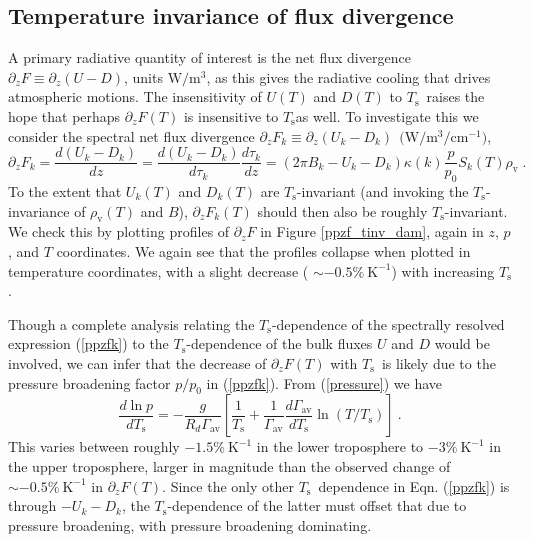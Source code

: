 \documentclass[10pt]{article}
\newcommand{\beqn}{\begin{equation}}
\newcommand{\eeqn}{\end{equation}}
\newcommand{\eqnref}[1]{(\ref{#1})}
\newcommand{\n}{\nonumber}
\newcommand{\der}[2]{\ensuremath{\frac{d #1}{d #2}}}
\newcommand{\ppz}{\ensuremath{\partial_z}}
\newcommand{\cminverse}{\ensuremath{\mathrm{cm^{-1}}}}
\newcommand{\tauk}{\ensuremath{\tau_k}}
\newcommand{\rhov}{\ensuremath{\rho_\mathrm{v}}}
\newcommand{\Ts}{\ensuremath{T_\mathrm{s}}}
\newcommand{\gammaav}{\ensuremath{\Gamma_\mathrm{av}}}
\newcommand{\Kinverse}{\ensuremath{\mathrm{K^{-1}}}}
\begin{document}
	\subsection{Temperature invariance of flux divergence}
		A primary radiative quantity of interest is the net flux divergence $\ppz F \equiv \ppz (U-D)$, units  $\mathrm{W/m^3}$, as this gives the radiative cooling that drives atmospheric motions. The insensitivity of $U(T)$ and $D(T)$ to \Ts\ raises the hope that perhaps $\ppz F(T)$ is insensitive to \Ts as  well. To investigate this we consider the spectral net flux divergence $\ppz F_k \equiv \ppz (U_k-D_k)\ \  \mathrm{(W/m^3/\cminverse})$,
	\beqn
		 \ppz F_k = \frac{d(U_k-D_k)}{dz} = \frac{d(U_k-D_k)}{d\tauk}\der{\tauk}{z} = (2\pi B_k-U_k-D_k)\kappa(k)\frac{p}{p_0}S_k(T) \rhov \; . 
		 \label{ppzfk}
	\eeqn
To the extent that $U_k(T)$ and $D_k(T)$ are $\Ts$-invariant (and invoking the $\Ts$-invariance of $\rhov(T)$ and $B$), $\ppz F_k(T)$ should then also be roughly \Ts-invariant. We check this by plotting profiles of $\ppz F$ in Figure \ref{ppzf_tinv_dam}, again in  $z$, $p$, and $T$ coordinates. We again see that the profiles collapse when plotted in temperature coordinates, with a slight decrease ( $\sim -0.5 \%\ \Kinverse$) with increasing \Ts. 

Though a complete analysis relating the \Ts-dependence of the spectrally resolved expression \eqnref{ppzfk} to the \Ts-dependence of the bulk fluxes $U$ and $D$ would be involved, we can infer that the decrease of $\ppz F(T)$ with \Ts\ is likely due to the pressure broadening factor $p/p_0$ in \eqnref{ppzfk}. From \eqnref{pressure} we have
	\beqn
		\frac{ d \ln  p}{d \Ts} = -\frac{g}{R_d \gammaav}\left[ \frac{1}{\Ts} + \frac{1}{\gammaav}\der{\gammaav}{\Ts}\ln(T/\Ts) \right] \ .
		\n
	\eeqn 
	This varies between roughly $-1.5 \%\ \Kinverse$ in the lower troposphere to $-3 \%\ \Kinverse$ in the upper troposphere, larger in magnitude than the observed change of  $\sim -0.5 \%\ \Kinverse$ in $\ppz F(T)$. Since the only other \Ts\ dependence in Eqn. \eqnref{ppzfk} is through $-U_k - D_k$, the \Ts-dependence of the latter must offset that due to pressure broadening, with pressure broadening dominating.
	
	
\end{document}
